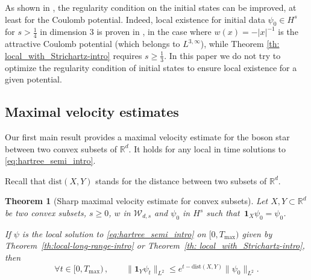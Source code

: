\documentclass[12pt]{article}
\newcommand{\dXY}{{\mathrm{dist}(X,Y)}}
\theoremstyle{plain}
\newtheorem{theo}{Theorem}[section]
\newcommand{\setW}{{\mathcal{W}_{d,s}}}
\begin{document}
As shown in \cite{HerrLenzmann}, the regularity condition on the initial states can be improved, at least for the Coulomb potential. Indeed, local existence for initial data $\psi_0\in H^s$ for $s>\frac14$ in dimension $3$ is proven in \cite{HerrLenzmann}, in the case where $w(x)=-|x|^{-1}$ is the attractive Coulomb potential (which belongs to $L^{3,\infty}$), while Theorem \ref{th: local_with_Strichartz-intro} requires $s\ge\frac13$. In this paper we do not try to optimize the regularity condition of initial states to ensure local existence for a given potential.

\subsection{Maximal velocity estimates}

Our first main result provides a maximal velocity estimate for the boson star between two convex subsets of $\mathbb{R}^d$. It holds for any local in time solutions to \eqref{eq:hartree_semi_intro}.

Recall that $\mathrm{dist}(X,Y)$ stands for the distance between two subsets of $\mathbb{R}^d$.

\begin{theo}[Sharp maximal velocity estimate for convex subsets]\label{th:max-vel-intro}
    Let $X,Y\subset\mathbb{R}^d$ be two convex subsets, $s\geq 0$, $w$ in $\setW$ and $\psi_0$ in $H^{s}$ such that~$\mathbf{1}_X\psi_0=\psi_0$.
    
    If $\psi$ is the local solution to \eqref{eq:hartree_semi_intro} on $[0,T_{\mathrm{max}})$ given by Theorem~\ref{th:local-long-range-intro} or Theorem~\ref{th: local_with_Strichartz-intro}, then
    \begin{equation}\label{eq:sharp_MVE}
       \forall t\in [0,T_{\mathrm{max}})\,,\qquad \|\mathbf{1}_Y\psi_t\|_{L^2}\le e^{t-\dXY}\|\psi_0\|_{L^2}.
    \end{equation}
\end{theo}
\end{document}
